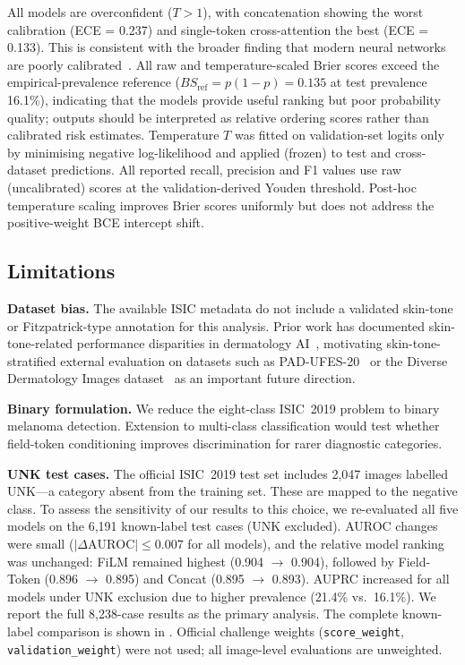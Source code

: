\documentclass[12pt, a4paper]{article}
\begin{document}
All models are overconfident ($T > 1$), with concatenation showing the worst calibration (ECE = 0.237) and single-token cross-attention the best (ECE = 0.133). This is consistent with the broader finding that modern neural networks are poorly calibrated~\citep{guo2017calibration}. All raw and temperature-scaled Brier scores exceed the empirical-prevalence reference ($BS_{\text{ref}} = p(1-p) = 0.135$ at test prevalence 16.1\%), indicating that the models provide useful ranking but poor probability quality; outputs should be interpreted as relative ordering scores rather than calibrated risk estimates. Temperature $T$ was fitted on validation-set logits only by minimising negative log-likelihood and applied (frozen) to test and cross-dataset predictions. All reported recall, precision and F1 values use raw (uncalibrated) scores at the validation-derived Youden threshold. Post-hoc temperature scaling improves Brier scores uniformly but does not address the positive-weight BCE intercept shift.

\subsection{Limitations}

\textbf{Dataset bias.} The available ISIC metadata do not include a validated skin-tone or Fitzpatrick-type annotation for this analysis. Prior work has documented skin-tone-related performance disparities in dermatology AI~\citep{groh2024deep}, motivating skin-tone-stratified external evaluation on datasets such as PAD-UFES-20~\citep{pacheco2020pad} or the Diverse Dermatology Images dataset~\citep{daneshjou2022disparities} as an important future direction.

\textbf{Binary formulation.} We reduce the eight-class ISIC~2019 problem to binary melanoma detection. Extension to multi-class classification would test whether field-token conditioning improves discrimination for rarer diagnostic categories.

\textbf{UNK test cases.} The official ISIC~2019 test set includes 2{,}047 images labelled UNK---a category absent from the training set. These are mapped to the negative class. To assess the sensitivity of our results to this choice, we re-evaluated all five models on the 6{,}191 known-label test cases (UNK excluded). AUROC changes were small ($|\Delta\text{AUROC}| \leq 0.007$ for all models), and the relative model ranking was unchanged: FiLM remained highest (0.904 $\to$ 0.904), followed by Field-Token (0.896 $\to$ 0.895) and Concat (0.895 $\to$ 0.893). AUPRC increased for all models under UNK exclusion due to higher prevalence (21.4\% vs.\ 16.1\%). We report the full 8{,}238-case results as the primary analysis. The complete known-label comparison is shown in . Official challenge weights (\texttt{score\_weight}, \texttt{validation\_weight}) were not used; all image-level evaluations are unweighted.
\end{document}

